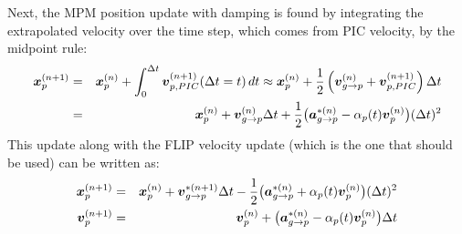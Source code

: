 \documentclass[11pt]{article}
\renewcommand{\vec}[1]{\boldsymbol{#1}}
\begin{document}
Next, the MPM position update with damping is found by integrating the extrapolated velocity over the time step, which comes from PIC velocity, by the midpoint rule:
\begin{eqnarray}
        \vec{x}_p^{(n+1)} & = & \vec{x}_p^{(n)} + \int_0^{\Delta t} \vec v_{p,PIC}^{(n+1)}(\Delta t=t) \thinspace dt \approx \vec{x}_p^{(n)} 
         + {1\over 2}\left(\vec v_{g\to p}^{(n)}+\vec v_{p,PIC}^{(n+1)}\right) \Delta t \\
         & = & \vec{x}_p^{(n)} +\vec v_{g\to p}^{(n)}\Delta t + {1\over 2} \bigl(\vec{a}_{g\to p}^{*(n)}  -  \alpha_p(t)\vec{v}_p^{(n)}\bigr)(\Delta t)^2 
\end{eqnarray}
This update along with the FLIP velocity update (which is the one that should be used) can be written as:
\begin{eqnarray}
   \vec{x}_{p}^{(n+1)} & = & \vec{x}_p^{(n)} + \vec v_{g\to p}^{*(n+1)}\Delta t - {1 \over 2}\bigl(\vec{a}_{g\to p}^{*(n)} +  \alpha_p(t)\vec v_p^{(n)} \bigr)(\Delta t)^2 \\
   \vec{v}_{p}^{(n+1)} & = & \vec{v}_p^{(n)} +  \bigl(\vec{a}_{g\to p}^{*(n)} -  \alpha_p(t)\vec v_p^{(n)} \bigr)\Delta t
\end{eqnarray}
\end{document}
